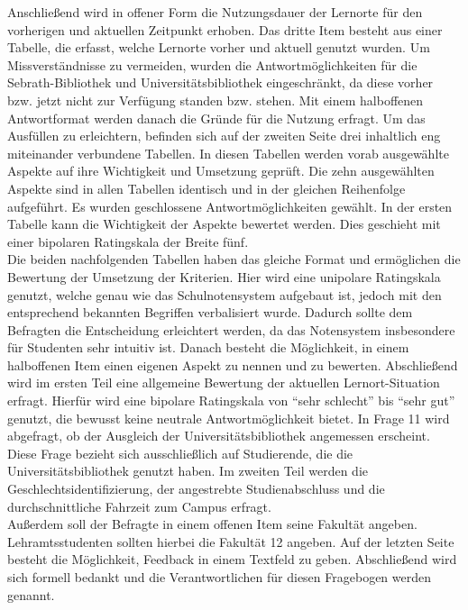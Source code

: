 \documentclass[11pt, a4paper]{article}
\begin{document}
Anschließend wird in offener Form die Nutzungsdauer der Lernorte für den vorherigen und aktuellen Zeitpunkt erhoben. Das dritte Item besteht aus einer Tabelle, die erfasst, welche Lernorte vorher und aktuell genutzt wurden.
Um Missverständnisse zu vermeiden, wurden die Antwortmöglichkeiten für die Sebrath-Bibliothek und Universitätsbibliothek eingeschränkt, da diese vorher bzw. jetzt nicht zur Verfügung standen bzw. stehen.
Mit einem halboffenen Antwortformat werden danach die Gründe für die Nutzung erfragt.
Um das Ausfüllen zu erleichtern, befinden sich auf der zweiten Seite drei inhaltlich eng miteinander verbundene Tabellen. In diesen Tabellen werden vorab ausgewählte Aspekte auf ihre Wichtigkeit und Umsetzung geprüft. Die zehn ausgewählten Aspekte sind in allen Tabellen identisch und  in der gleichen Reihenfolge aufgeführt. Es wurden geschlossene Antwortmöglichkeiten gewählt.
In der ersten Tabelle kann die Wichtigkeit der Aspekte bewertet werden. Dies geschieht mit einer bipolaren Ratingskala der Breite fünf.\\

Die beiden nachfolgenden Tabellen haben das gleiche Format und ermöglichen die Bewertung der Umsetzung der Kriterien. Hier wird eine unipolare Ratingskala genutzt, welche genau wie das Schulnotensystem aufgebaut ist, jedoch
mit den entsprechend bekannten Begriffen verbalisiert wurde.
Dadurch sollte dem Befragten die Entscheidung erleichtert werden, da das Notensystem insbesondere für Studenten sehr intuitiv ist. 
Danach besteht die Möglichkeit, in einem halboffenen Item einen eigenen Aspekt zu nennen und zu bewerten.
Abschließend wird im ersten Teil eine allgemeine Bewertung der aktuellen Lernort-Situation erfragt.
Hierfür wird eine bipolare Ratingskala von “sehr schlecht” bis “sehr gut” genutzt, die bewusst keine neutrale Antwortmöglichkeit bietet.
In Frage 11 wird abgefragt, ob der Ausgleich der Universitätsbibliothek angemessen erscheint. Diese Frage bezieht sich ausschließlich auf Studierende, die die Universitätsbibliothek genutzt haben.
Im zweiten Teil werden die Geschlechtsidentifizierung, der angestrebte Studienabschluss und die durchschnittliche Fahrzeit zum Campus erfragt.\\

Außerdem soll der Befragte in einem offenen Item seine Fakultät angeben.
Lehramtsstudenten sollten hierbei die Fakultät 12 angeben.
Auf der letzten Seite besteht die Möglichkeit, Feedback in einem Textfeld zu geben.
Abschließend wird sich formell bedankt und die Verantwortlichen für diesen Fragebogen werden genannt.
\end{document}
